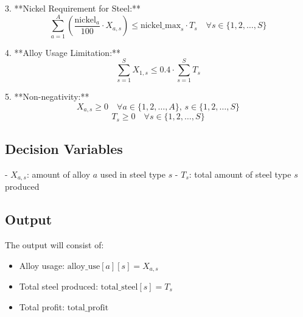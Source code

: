 \documentclass{article}
\begin{document}
3. **Nickel Requirement for Steel:**
\[
\sum_{a=1}^{A} \left( \frac{\text{nickel}_{a}}{100} \cdot X_{a,s} \right) \leq \text{nickel\_max}_{s} \cdot T_{s} \quad \forall s \in \{1, 2, \ldots, S\}
\]

4. **Alloy Usage Limitation:**
\[
\sum_{s=1}^{S} X_{1,s} \leq 0.4 \cdot \sum_{s=1}^{S} T_{s}
\]

5. **Non-negativity:**
\[
X_{a,s} \geq 0 \quad \forall a \in \{1, 2, \ldots, A\}, \, s \in \{1, 2, \ldots, S\}
\]
\[
T_{s} \geq 0 \quad \forall s \in \{1, 2, \ldots, S\}
\]

\subsection*{Decision Variables}
- \( X_{a,s} \): amount of alloy \( a \) used in steel type \( s \)
- \( T_{s} \): total amount of steel type \( s \) produced

\subsection*{Output}
The output will consist of:
\begin{itemize}
    \item Alloy usage: \( \text{alloy\_use}[a][s] = X_{a,s} \)
    \item Total steel produced: \( \text{total\_steel}[s] = T_{s} \)
    \item Total profit: \( \text{total\_profit} \)
\end{itemize}
\end{document}
